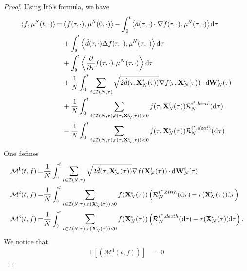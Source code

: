 \documentclass[preprint,12pt]{elsarticle}
\theoremstyle{definition}
\theoremstyle{remark}
\begin{document}
\begin{proof}
    Using It\^o's formula, we have 
\begin{equation*}
    \begin{aligned}
        \langle f,\mu^N(t,\cdot)\rangle = &\left\langle f(\tau,\cdot), \mu^N(0,\cdot)\right\rangle - \int_0^t\left\langle \hat a(\tau,\cdot)\cdot \nabla f(\tau,\cdot) ,\mu^N(\tau,\cdot)\right\rangle\mathrm{d} \tau \\
        &+ \int_0^t\left\langle \hat d(\tau, \cdot) \Delta f(\tau,\cdot),\mu^N(\tau,\cdot)\right\rangle \mathrm{d} \tau\\
        &+ \int_0^t\left\langle  \frac{\partial}{\partial \tau} f(\tau,\cdot),\mu^N(\tau,\cdot)\right\rangle \mathrm{d}\tau\\
        &+ \frac{1}{N} \int_0^t \sum_{i\in \mathcal I (N,\tau)} \sqrt{2 \hat d(\tau,\mathbf{X}_N^i(\tau))} \nabla f(\tau,\mathbf{X}_N^i(\tau))\cdot \mathrm{d} \mathbf{W}_N^i(\tau)\\
        &+  \frac{1}{N} \int_0^t \sum_{i\in \mathcal I (N,\tau), \hat r(\tau, \mathbf{X}^i_N(\tau))>0} f(\tau,\mathbf{X}_N^i(\tau))\mathcal R_N^{i^*,birth}(\mathrm{d} \tau)\\
        &-  \frac{1}{N} \int_0^t \sum_{i\in \mathcal I (N,\tau), r(\tau, \mathbf{X}^i_N(\tau))<0} f(\tau,\mathbf{X}_N^i(\tau)) \mathcal R_N^{i^*,death}(\mathrm{d} \tau)
    \end{aligned}
\end{equation*}
One defines 
\begin{equation*}
    \begin{aligned}
        \mathcal M^1(t,f) =& \frac{1}{N} \int_0^t \sum_{i\in \mathcal I(N,\tau)} \sqrt{2 \hat d(\tau,\mathbf{X}_N^i(\tau))} \nabla f(\mathbf{X}_N^i(\tau))\cdot \mathrm{d} \mathbf{W}_N^i(\tau)\\
        \mathcal M^2(t,f) =& \frac{1}{N} \int_0^t \sum_{i\in \mathcal I(N,\tau), r(\mathbf{X}^i_N(\tau))>0} f(\mathbf{X}_N^i(\tau))\left(\mathcal R_N^{i^*,birth}(\mathrm{d} \tau) -r(\mathbf{X}_N^i(\tau))\mathrm{d} \tau\right)\\
        \mathcal M^3(t,f) =& \frac{1}{N} \int_0^t \sum_{i\in \mathcal I(N,\tau), r(\mathbf{X}^i_N(\tau))<0} f(\mathbf{X}_N^i(\tau)) \left(\mathcal R_N^{i^*,death}(\mathrm{d} \tau)-r(\mathbf{X}_N^i(\tau))\mathrm{d} \tau\right).
    \end{aligned}
\end{equation*}
We notice that 
\begin{equation}
\begin{aligned}
    \mathbb E\left[ \left(\mathcal M^1(t,f) \right)\right] &= 0
\end{aligned}
\end{equation}

\end{proof}
\end{document}
